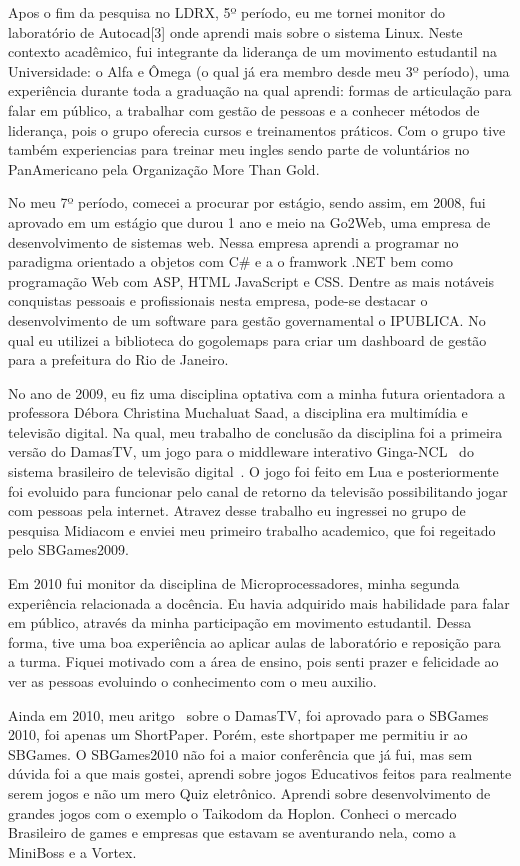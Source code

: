 \documentclass[10pt,a4paper,oneside]{book}
\begin{document}
Apos o fim da pesquisa no LDRX, 5º período, eu me tornei monitor do laboratório de Autocad[3] 
onde aprendi mais sobre o sistema Linux. Neste contexto acadêmico, fui integrante da liderança de um  
movimento estudantil na Universidade: o Alfa e Ômega (o qual já era membro desde meu 3º período), 
uma experiência durante toda a graduação na qual aprendi:  formas de articulação para falar em público, 
a trabalhar com gestão de pessoas e a conhecer métodos de liderança, pois o grupo oferecia cursos e treinamentos práticos.  
Com o grupo tive também experiencias para treinar meu ingles sendo parte de voluntários no PanAmericano pela
Organização More Than Gold.

No meu 7º período, comecei a procurar por estágio, sendo assim, em 2008, fui aprovado em um estágio 
que durou 1 ano e meio na Go2Web, uma empresa de desenvolvimento de sistemas web. Nessa
empresa aprendi a programar no paradigma orientado a objetos com C\# e a o framwork .NET bem como 
programação Web com ASP, HTML JavaScript e CSS.
Dentre as mais notáveis conquistas pessoais e profissionais nesta empresa, pode-se destacar o 
desenvolvimento de um software para gestão governamental o IPUBLICA.
No qual eu utilizei a biblioteca do gogolemaps para criar um dashboard de gestão para a prefeitura 
do Rio de Janeiro.

No ano de 2009, eu fiz uma disciplina optativa com a minha futura orientadora a professora 
Débora Christina Muchaluat Saad, a disciplina era multimídia e televisão digital. Na qual,
meu trabalho de conclusão da disciplina foi a primeira versão do DamasTV, um jogo para o middleware 
interativo Ginga-NCL~\cite{soares2007ginga} do sistema brasileiro de televisão digital~\cite{mendes2007sbtvd}. 
O jogo foi feito em Lua e posteriormente foi evoluido para funcionar pelo canal de retorno da televisão
possibilitando jogar com pessoas pela internet.
Atravez desse trabalho eu ingressei no grupo de pesquisa Midiacom e enviei meu primeiro trabalho academico,
que foi regeitado pelo SBGames2009.

Em 2010 fui monitor da disciplina de Microprocessadores,  minha segunda experiência 
relacionada a docência. Eu havia adquirido mais habilidade para falar em público, através da minha 
participação em movimento estudantil. Dessa forma,  tive uma boa experiência ao aplicar aulas de 
laboratório e reposição para a turma. Fiquei motivado com a área de ensino, pois senti prazer e 
felicidade ao ver as pessoas evoluindo o conhecimento com o meu auxilio. 

Ainda em 2010, meu aritgo~\cite{saad2010damastv} sobre o DamasTV, foi aprovado para o SBGames 2010, foi 
apenas um ShortPaper. Porém, este shortpaper me permitiu ir ao SBGames. O SBGames2010 não foi a 
maior conferência que já fui, mas sem dúvida foi a que mais gostei, aprendi sobre jogos Educativos 
feitos para realmente serem jogos e não um mero Quiz eletrônico. Aprendi sobre desenvolvimento de 
grandes jogos com o exemplo o Taikodom da Hoplon. Conheci o mercado Brasileiro de games e empresas 
que estavam se aventurando nela, como a MiniBoss e a Vortex.
\end{document}
